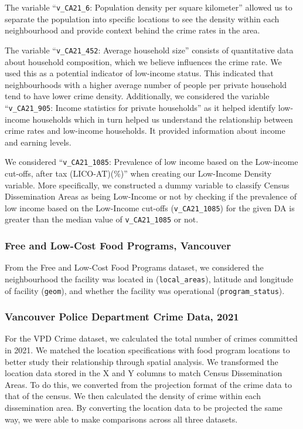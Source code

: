 \documentclass[AEJ]{AEA}
\begin{document}
The variable ``\texttt{v\_CA21\_6}: Population density per square kilometer'' allowed us to separate the population into specific locations to see the density within each neighbourhood and provide context behind the crime rates in the area. 

The variable ``\texttt{v\_CA21\_452}: Average household size'' consists of quantitative data about household composition, which we believe influences the crime rate. We used this as a potential indicator of low-income status. This indicated that neighbourhoods with a higher average number of people per private household tend to have lower crime density. Additionally, we considered the variable ``\texttt{v\_CA21\_905}: Income statistics for private households'' as it helped identify low-income households which in turn helped us understand the relationship between crime rates and low-income households. It provided information about income and earning levels.

We considered ``\texttt{v\_CA21\_1085}: Prevalence of low income based on the Low-income cut-offs, after tax (LICO-AT)(\%)'' when creating our Low-Income Density variable. More specifically, we constructed a dummy variable to classify Census Dissemination Areas as being Low-Income or not by checking if the prevalence of low income based on the Low-Income cut-offs (\texttt{v\_CA21\_1085}) for the given DA is greater than the median value of \texttt{v\_CA21\_1085} or not.

\subsubsection{Free and Low-Cost Food Programs, Vancouver}
From the Free and Low-Cost Food Programs dataset, we considered the neighbourhood the facility was located in (\texttt{local\_areas}), latitude and longitude of facility (\texttt{geom}), and whether the facility was operational (\texttt{program\_status}).

\subsubsection{Vancouver Police Department Crime Data, 2021}
For the VPD Crime dataset, we calculated the total number of crimes committed in 2021. We matched the location specifications with food program locations to better study their relationship through spatial analysis. We transformed the location data stored in the X and Y columns to match Census Dissemination Areas. To do this, we converted from the projection format of the crime data to that of the census. We then calculated the density of crime within each dissemination area. By converting the location data to be projected the same way, we were able to make comparisons across all three datasets.
\end{document}
